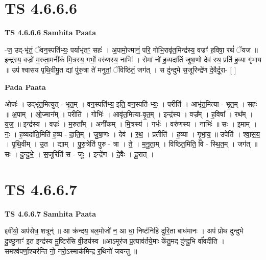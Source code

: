 \documentclass[17pt]{extarticle}
\begin{document}

\section{ TS 4.6.6.6 }

\textbf{TS 4.6.6.6 } \newline
\textbf{Samhita Paata} \newline

-ज॒ उद्-भृ॑तं॒ ॅवन॒स्पति॑भ्यः॒ पर्याभृ॑तꣳ॒॒ सहः॑ । अ॒पामो॒ज्मानं॒ परि॒ गोभि॒रावृ॑त॒मिन्द्र॑स्य॒ वज्रꣳ॑ ह॒विषा॒ रथं॑ ॅयज ॥ इन्द्र॑स्य॒ वज्रो॑ म॒रुता॒मनी॑कं मि॒त्रस्य॒ गर्भो॒ वरु॑णस्य॒ नाभिः॑ । सेमां नो॑ ह॒व्यदा॑तिं जुषा॒णो देव॑ रथ॒ प्रति॑ ह॒व्या गृ॑भाय ॥ उप॑ श्वासय पृथि॒वीमु॒त द्यां पु॑रु॒त्रा ते॑ मनुतां॒ ॅविष्ठि॑तं॒ जग॑त् । स दु॑न्दुभे स॒जूरिन्द्रे॑ण दे॒वैर्दू॒रा- [  ] \newline

\textbf{Pada Paata} \newline

ओजः॑ । उद्भृ॑त॒मित्युत् - भृ॒त॒म् । वन॒स्पति॑भ्य॒ इति॒ वन॒स्पति॑-भ्यः॒ । परीति॑ । आभृ॑त॒मित्या - भृ॒त॒म् । सहः॑ ॥ अ॒पाम् । ओ॒ज्मान᳚म् । परीति॑ । गोभिः॑ । आवृ॑त॒मित्या-वृ॒त॒म् । इन्द्र॑स्य । वज्र᳚म् । ह॒विषा᳚ । रथ᳚म् । य॒ज॒ ॥ इन्द्र॑स्य । वज्रः॑ । म॒रुता᳚म् । अनी॑कम् । मि॒त्रस्य॑ । गर्भः॑ । वरु॑णस्य । नाभिः॑ ॥ सः । इ॒माम् । नः॒ । ह॒व्यदा॑ति॒मिति॑ ह॒व्य - दा॒ति॒म् । जु॒षा॒णः । देव॑ । र॒थ॒ । प्रतीति॑ । ह॒व्या । गृ॒भा॒य॒ ॥ उपेति॑ । श्वा॒स॒य॒ । पृ॒थि॒वीम् । उ॒त । द्याम् । पु॒रु॒त्रेति॑ पुरु - त्रा । ते॒ । म॒नु॒ता॒म् । विष्ठि॑त॒मिति॒ वि - स्थि॒त॒म् । जग॑त् ॥ सः । दु॒न्दु॒भे॒ । स॒जूरिति॑ स - जूः । इन्द्रे॑ण । दे॒वैः । दू॒रात् ।  \newline





\section{ TS 4.6.6.7 }

\textbf{TS 4.6.6.7 } \newline
\textbf{Samhita Paata} \newline

द्दवी॑यो॒ अप॑सेध॒ शत्रून्॑ ॥ आ क्र॑न्दय॒ बल॒मोजो॑ न॒ आ धा॒ निष्ट॑निहि दुरि॒ता बाध॑मानः । अप॑ प्रोथ दुन्दुभे दु॒च्छुनाꣳ॑ इ॒त इन्द्र॑स्य मु॒ष्टिर॑सि वी॒डय॑स्व ॥आऽमूर॑ज प्र॒त्याव॑र्तये॒माः के॑तु॒मद् दु॑न्दु॒भि र्वा॑वदीति । समश्व॑पर्णा॒श्चर॑न्ति नो॒ नरो॒ऽस्माक॑मिन्द्र र॒थिनो॑ जयन्तु ॥ \newline
\end{document}
